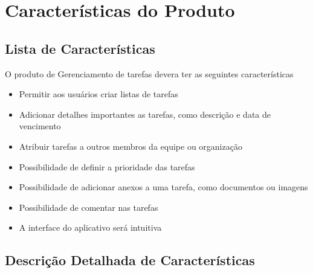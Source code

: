 \chapter{Características do Produto}

\section{Lista de Características}

O produto de Gerenciamento de tarefas devera ter as seguintes características

\begin{itemize}
    \item Permitir aos usuários criar listas de tarefas
    \item Adicionar detalhes importantes as tarefas, como descrição e data de vencimento
    \item Atribuir tarefas a outros membros da equipe ou organização
    \item Possibilidade de definir a prioridade das tarefas
    \item Possibilidade de adicionar anexos a uma tarefa, como documentos ou imagens
    \item Possibilidade de comentar nas tarefas
    \item A interface do aplicativo será intuitiva
\end{itemize}

\section{Descrição Detalhada de Características}

